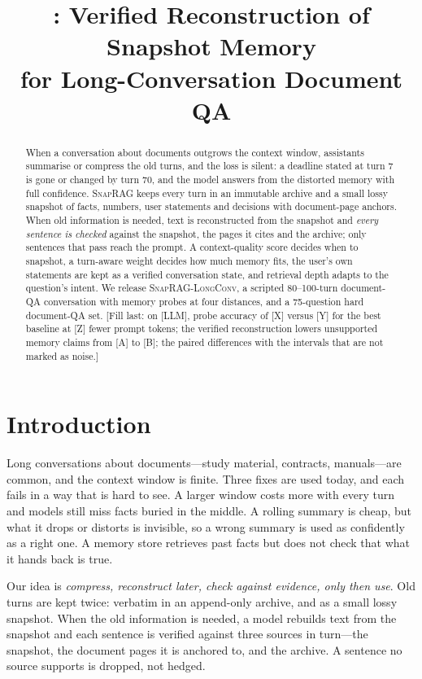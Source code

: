 \documentclass[10pt,twocolumn]{article}
\title{\sys: Verified Reconstruction of Snapshot Memory\\for Long-Conversation Document QA}
\author{\todo{authors and affiliations}}
\date{}
\newcommand{\todo}[1]{{\color{red}[#1]}}      %
\newcommand{\sys}{\textsc{SnapRAG}}
\newcommand{\bench}{\textsc{SnapRAG-LongConv}}
\begin{document}
\maketitle

\begin{abstract}
When a conversation about documents outgrows the context window, assistants summarise or compress the old turns, and the loss is silent: a deadline stated at turn 7 is gone or changed by turn 70, and the model answers from the distorted memory with full confidence.
\sys{} keeps every turn in an immutable archive and a small lossy snapshot of facts, numbers, user statements and decisions with document-page anchors.
When old information is needed, text is reconstructed from the snapshot and \emph{every sentence is checked} against the snapshot, the pages it cites and the archive; only sentences that pass reach the prompt.
A context-quality score decides when to snapshot, a turn-aware weight decides how much memory fits, the user's own statements are kept as a verified conversation state, and retrieval depth adapts to the question's intent.
We release \bench{}, a scripted 80--100-turn document-QA conversation with memory probes at four distances, and a 75-question hard document-QA set.
\todo{Fill last: on [LLM], probe accuracy of [X] versus [Y] for the best baseline at [Z] fewer prompt tokens; the verified reconstruction lowers unsupported memory claims from [A] to [B]; the paired differences with the intervals that are not marked as noise.}
\end{abstract}

\section{Introduction}
Long conversations about documents---study material, contracts, manuals---are common, and the context window is finite.
Three fixes are used today, and each fails in a way that is hard to see. A larger window costs more with every turn and models still miss facts buried in the middle. A rolling summary is cheap, but what it drops or distorts is invisible, so a wrong summary is used as confidently as a right one. A memory store retrieves past facts but does not check that what it hands back is true.

Our idea is \emph{compress, reconstruct later, check against evidence, only then use}.
Old turns are kept twice: verbatim in an append-only archive, and as a small lossy snapshot. When the old information is needed, a model rebuilds text from the snapshot and each sentence is verified against three sources in turn---the snapshot, the document pages it is anchored to, and the archive. A sentence no source supports is dropped, not hedged.
\end{document}
